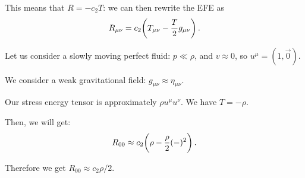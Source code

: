 \documentclass[main.tex]{subfiles}
\begin{document}
This means that \(R = - c_2 T\):
we can then rewrite the EFE as 
%
\begin{equation}
  R_{\mu \nu } = c_2 \qty(T_{\mu \nu } - \frac{T}{2}g_{\mu \nu })
\,.
\end{equation}
%

Let us consider a slowly moving perfect fluid: \(p \ll \rho \), and \(v \approx  0\), so \(u^{\mu } = (1, \vec{0})\).

We consider a weak gravitational field: \(g_{\mu \nu } \approx \eta_{\mu \nu } \).

Our stress energy tensor is approximately \(\rho u^{\mu } u^{\nu }\). We have \(T = - \rho \).

Then, we will get: 
%
\begin{equation}
  R_{00} \approx c_2 \qty(\rho - \frac{\rho}{2} (-)^2)
\,.
\end{equation}

Therefore we get \(R_{00} \approx c_2 \rho /2\).
\end{document}
